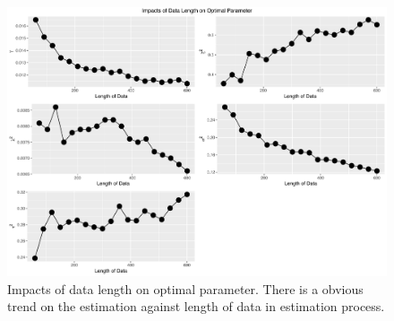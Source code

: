 \begin{figure}[h]
\centering
\includegraphics[width=\textwidth,height=0.5\textheight]{Chapters/05MCMCOU/plots/realdatalengthcompare.pdf}
\caption{Impacts of data length on optimal parameter. There is a obvious trend on the estimation against length of data in estimation process. }
\end{figure}



